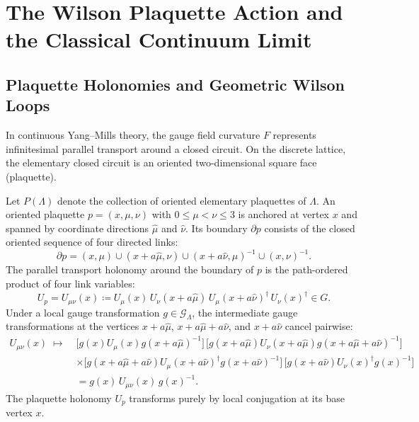 \section{The Wilson Plaquette Action and the Classical Continuum Limit}
\label{sec:wilson_action}

\subsection{Plaquette Holonomies and Geometric Wilson Loops}
\label{subsec:plaquette_holonomies}
In continuous Yang--Mills theory, the gauge field curvature $F$ represents infinitesimal parallel transport around a closed circuit. On the discrete lattice, the elementary closed circuit is an oriented two-dimensional square face (plaquette).

Let $P(\Lambda)$ denote the collection of oriented elementary plaquettes of $\Lambda$. An oriented plaquette $p = (x, \mu, \nu)$ with $0 \le \mu < \nu \le 3$ is anchored at vertex $x$ and spanned by coordinate directions $\hat{\mu}$ and $\hat{\nu}$. Its boundary $\partial p$ consists of the closed oriented sequence of four directed links:
\begin{equation}
\partial p = (x, \mu) \cup (x + a\hat{\mu}, \nu) \cup (x + a\hat{\nu}, \mu)^{-1} \cup (x, \nu)^{-1}.
\end{equation}
The parallel transport holonomy around the boundary of $p$ is the path-ordered product of four link variables:
\begin{equation}
\label{eq:plaquette_holonomy_def}
U_p = U_{\mu\nu}(x) \coloneqq U_\mu(x) \, U_\nu(x + a\hat{\mu}) \, U_\mu(x + a\hat{\nu})^\dagger \, U_\nu(x)^\dagger \in G.
\end{equation}
Under a local gauge transformation $g \in \mathcal{G}_\Lambda$, the intermediate gauge transformations at the vertices $x + a\hat{\mu}$, $x + a\hat{\mu} + a\hat{\nu}$, and $x + a\hat{\nu}$ cancel pairwise:
\begin{align}
U_{\mu\nu}(x) \;\mapsto\; &\bigl[ g(x) U_\mu(x) g(x + a\hat{\mu})^{-1} \bigr] \, \bigl[ g(x + a\hat{\mu}) U_\nu(x + a\hat{\mu}) g(x + a\hat{\mu} + a\hat{\nu})^{-1} \bigr] \nonumber \\
&\times \bigl[ g(x + a\hat{\mu} + a\hat{\nu}) U_\mu(x + a\hat{\nu})^\dagger g(x + a\hat{\nu})^{-1} \bigr] \, \bigl[ g(x + a\hat{\nu}) U_\nu(x)^\dagger g(x)^{-1} \bigr] \nonumber \\
&= g(x) \, U_{\mu\nu}(x) \, g(x)^{-1}.
\end{align}
The plaquette holonomy $U_p$ transforms purely by local conjugation at its base vertex $x$.

